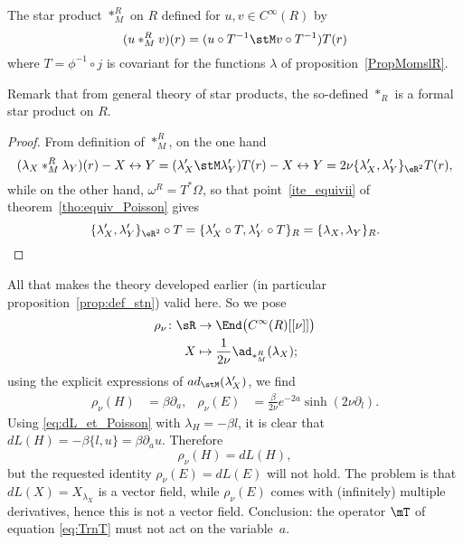 \begin{corollary}
The star product $\ast_M^R$ on $R$ defined for $u,v\in C^{\infty}(R)$ by
\begin{equation}
  (u\ast_M^R v)(r)=( u\circ T^{-1}\stM v\circ T^{-1} )T(r)
\end{equation}
where $T=\phi^{-1}\circ j$ is covariant for the functions $\lambda$ of proposition~\ref{PropMomslR}.

\end{corollary}
Remark that from general theory of star products, the so-defined $\ast_R$ is a formal star product on $R$.

\begin{proof}
From definition of $\ast_M^R$, on the one hand
\[
  (\lambda_X\ast_M^R \lambda_Y)(r)-X\leftrightarrow Y=(\lambda'_X\stM\lambda'_Y)T(r)-X\leftrightarrow Y
=2\nu\{  \lambda'_X,\lambda'_Y \}_{\eR^2}T(r),
\]
while on the other hand, $\omega^R=T^*\Omega$, so that point~\ref{ite_equivii} of theorem~\ref{tho:equiv_Poisson}  gives
\[
  \{ \lambda'_X,\lambda'_Y \}_{\eR^2}\circ T=\{ \lambda'_X\circ T,\lambda'_Y\circ T \}_R=\{ \lambda_X,\lambda_Y \}_R.
\]

\end{proof}

All that makes the theory developed earlier (in particular proposition~\ref{prop:def_stn}) valid here. So we pose
\begin{equation}
\begin{aligned}
 {\rho_{\nu}}\colon\sR &\to {\End\big(  C^{\infty}(R)[ [\nu]] \big)} \\
  X &\mapsto {\frac{1}{2\nu}\ad_{\ast_M^R}(\lambda_X);}
\end{aligned}
\end{equation}
using the explicit expressions of $ad_{\stM}(\lambda'_X)$, we find
\begin{align}
  \rho_{\nu}(H)&=\beta\partial_a,   &\rho_{\nu}(E)&=\frac{\beta}{2\nu}e^{-2a}\sinh(2\nu\partial_l).
\end{align}
Using \eqref{eq:dL_et_Poisson} with $\lambda_H=-\beta l$, it is clear that $dL(H)=-\beta\{l,u\}=\beta\partial_a u$. Therefore
\begin{equation}
   \rho_{\nu}(H)=dL(H),
\end{equation}
but the requested identity $\rho_{\nu}(E)=dL(E)$ will not hold. The problem is that $dL(X)=X_{\lambda_X}$ is a vector field, while $\rho_{\nu}(E)$ comes with (infinitely) multiple derivatives, hence this is not a vector field. Conclusion: the operator $\mT$ of equation \eqref{eq:TrnT} must not act on the variable~$a$.

